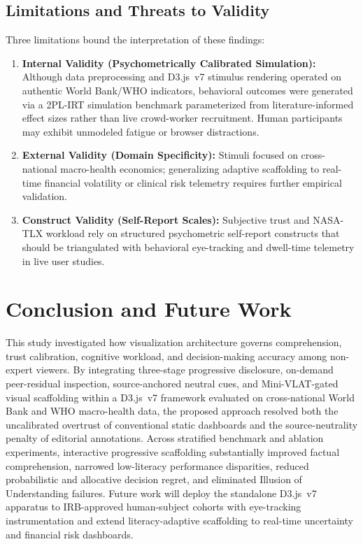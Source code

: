 \documentclass[conference]{IEEEtran}
\begin{document}
\subsection{Limitations and Threats to Validity}
Three limitations bound the interpretation of these findings:
\begin{enumerate}
\item \textbf{Internal Validity (Psychometrically Calibrated Simulation):} Although data preprocessing and D3.js~v7 stimulus rendering operated on authentic World Bank/WHO indicators, behavioral outcomes were generated via a 2PL-IRT simulation benchmark parameterized from literature-informed effect sizes rather than live crowd-worker recruitment. Human participants may exhibit unmodeled fatigue or browser distractions.
\item \textbf{External Validity (Domain Specificity):} Stimuli focused on cross-national macro-health economics; generalizing adaptive scaffolding to real-time financial volatility or clinical risk telemetry requires further empirical validation.
\item \textbf{Construct Validity (Self-Report Scales):} Subjective trust and NASA-TLX workload rely on structured psychometric self-report constructs that should be triangulated with behavioral eye-tracking and dwell-time telemetry in live user studies.
\end{enumerate}

\section{Conclusion and Future Work}
\label{sec:conclusion}
This study investigated how visualization architecture governs comprehension, trust calibration, cognitive workload, and decision-making accuracy among non-expert viewers. By integrating three-stage progressive disclosure, on-demand peer-residual inspection, source-anchored neutral cues, and Mini-VLAT-gated visual scaffolding within a D3.js~v7 framework evaluated on cross-national World Bank and WHO macro-health data, the proposed approach resolved both the uncalibrated overtrust of conventional static dashboards and the source-neutrality penalty of editorial annotations. Across stratified benchmark and ablation experiments, interactive progressive scaffolding substantially improved factual comprehension, narrowed low-literacy performance disparities, reduced probabilistic and allocative decision regret, and eliminated Illusion of Understanding failures. Future work will deploy the standalone D3.js~v7 apparatus to IRB-approved human-subject cohorts with eye-tracking instrumentation and extend literacy-adaptive scaffolding to real-time uncertainty and financial risk dashboards.
\end{document}
